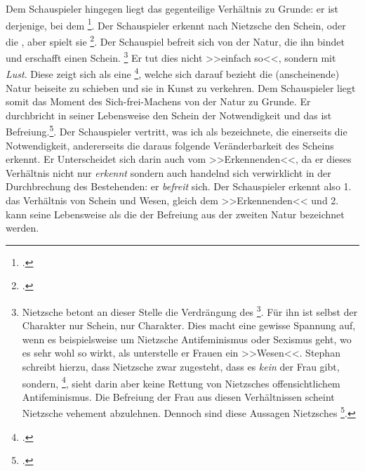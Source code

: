 \documentclass[12pt, a4paper, openany]{report}
\begin{document}
Dem Schauspieler hingegen liegt das gegenteilige Verhältnis zu Grunde: 
er ist derjenige, bei dem \footcite[][596]{nietzsche_morgenrote_1999}.
Der Schauspieler erkennt nach Nietzsche den Schein, oder die , aber spielt sie \footcite[][608]{nietzsche_morgenrote_1999}.
Der Schauspiel befreit sich von der Natur, die ihn bindet und erschafft einen Schein.%
\footnote{
    Nietzsche betont an dieser Stelle die Verdrängung des \footcite[][608]{nietzsche_morgenrote_1999}.
    Für ihn ist selbst der Charakter nur Schein, nur  Charakter.
    Dies macht eine gewisse Spannung auf, wenn es beispielsweise um Nietzsche Antifeminismus oder Sexismus geht, wo es sehr wohl so wirkt, als unterstelle er Frauen ein >>Wesen<<.
    Stephan schreibt hierzu, dass Nietzsche zwar zugesteht, dass es \emph{kein}  der Frau gibt, sondern, \footcite[Vgl.][50]{stephan_nietzscheanismus_2019}, sieht darin aber keine Rettung von Nietzsches offensichtlichem Antifeminismus.
    Die Befreiung der Frau aus diesen Verhältnissen scheint Nietzsche vehement abzulehnen.
    Dennoch sind diese Aussagen Nietzsches \footcite[][61]{stephan_nietzscheanismus_2019}.
}
Er tut dies nicht >>einfach so<<, sondern mit \emph{Lust}.
Diese  zeigt sich als eine \footcite[][608]{nietzsche_morgenrote_1999}, welche sich darauf bezieht die (anscheinende) Natur beiseite zu schieben und sie in Kunst zu verkehren.
Dem Schauspieler liegt somit das Moment des Sich-frei-Machens von der Natur zu Grunde. 
Er durchbricht in seiner Lebensweise den Schein der Notwendigkeit und das ist Befreiung.\footcite[Vgl.][41]{menke_autonomie_2018}.
Der Schauspieler vertritt, was ich als  bezeichnete, die einerseits die Notwendigkeit, andererseits die daraus folgende Veränderbarkeit des Scheins erkennt.
Er Unterscheidet sich darin auch vom >>Erkennenden<<, da er dieses Verhältnis nicht nur \emph{erkennt} sondern auch handelnd sich verwirklicht in der Durchbrechung des Bestehenden: 
er \emph{befreit} sich.
Der Schauspieler erkennt also 1. das Verhältnis von Schein und Wesen, gleich dem >>Erkennenden<< und 2. kann seine Lebensweise als die der Befreiung aus der zweiten Natur bezeichnet werden. 
\\
\end{document}
